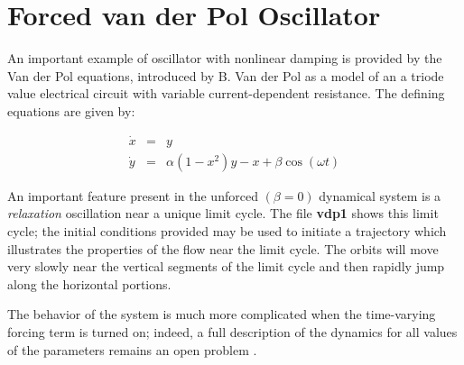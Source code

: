\section{Forced van der Pol Oscillator}

\noindent An important example of oscillator with nonlinear damping
is provided by the Van der Pol equations, introduced by B. Van der Pol \cite{vdp1}
as a model of an a triode value electrical circuit with variable
current-dependent resistance.  The defining equations are given by:

\begin{eqnarray*}
   \dot{x} & = & y  \\
   \dot{y} & = & \alpha (1-x^2) y - x + \beta \cos(\omega t)     
\end{eqnarray*}

\noindent An important feature present 
in the unforced $(\beta=0)$ dynamical system is
a {\em relaxation} oscillation near a unique limit cycle. 
The file {\bf vdp1} shows this limit cycle;  the initial conditions
provided may be used to initiate a trajectory which illustrates
the properties of the flow near the limit cycle.  The orbits will
move very slowly near the vertical  segments of the limit cycle and
then rapidly jump along the horizontal portions.
\medskip

\noindent The behavior of the system is much more complicated when the
time-varying forcing term is turned on;  indeed, a full description of
the dynamics for all values of the parameters remains an open problem \cite{gucken2}.






